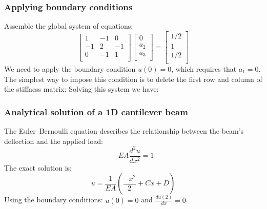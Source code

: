 \documentclass[handout]{beamer}
\begin{document}
\begin{frame}
\frametitle{Applying boundary conditions}
Assemble the global system of equations:
\begin{equation*}
\begin{bmatrix}
1 & -1 &  0  \\
-1 &  2 & -1 \\
0 & -1 &  1 \\ 
\end{bmatrix}
\begin{bmatrix}
0 \\
a_2 \\
a_3 \\
\end{bmatrix} = %
\begin{bmatrix}
1/2 \\
1 \\
1/2 \\
\end{bmatrix}
\end{equation*}
We need to apply the boundary condition $u(0) = 0$, which requires that $a_1 = 0$. The
simplest way to impose this condition is to delete the first row and column of the
stiffness matrix:
Solving this system we have: 
\end{frame}

\begin{frame}
\frametitle{Analytical solution of a 1D cantilever beam}
The Euler–Bernoulli equation describes the relationship between the beam's deflection and the applied load:
\begin{equation*}
	-EA\frac{d^2u}{dx^2} = 1
\end{equation*}
The exact solution is:
\begin{equation*}
	u = \frac{1}{EA}(\frac{-x^2}{2} + Cx + D)
\end{equation*}
Using the boundary conditions: $u(0) = 0$ and $\frac{du(2)}{dx} = 0$. 
\end{frame}
\end{document}
